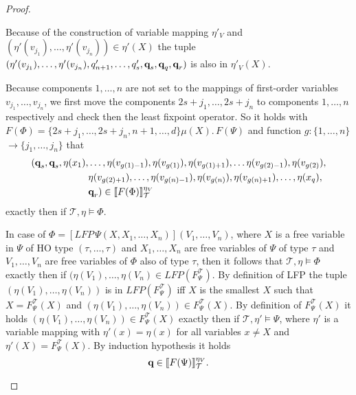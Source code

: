 \begin{proof}
\begin{compactitem}
Because of the construction of variable mapping $\eta'_V$ and $(\eta'(v_{j_1}), \dots, 
        \eta'(v_{j_n})) \in \eta'(X)$ the
        tuple $(\eta'(v_{j_1}), \dots, \eta'(v_{j_n}), q_{n+1}', \dots, q_s', \emph{q}_s, \emph{q}_q, \emph{q}_r)$ is also in $\eta'_V(X)$.         
        
       Because components $1, \dots, n$ are not set to the mappings of first-order variables 
       $v_{j_1}, \dots, v_{j_n}$, we first move the components $2s+j_1, \dots, 2s+j_n$ to components $1, \dots, n$ respectively and check then the least fixpoint operator.
        So it holds with $F(\Phi) = \{2s+j_1, \dots, 2s+j_n, n+1, \dots, d\} \mu (X).\, F(\Psi)$ and
        function $g: \{1, \dots, n\} $ $\rightarrow \{j_1, \dots, j_n\}$ that
        \begin{align*}
            (\emph{q}_s, \emph{q}_s, \eta(x_1),& \dots, \eta(v_{g(1)-1}), \eta(v_{g(1)}), \eta(v_{g(1)+1}), \dots \eta(v_{g(2)-1}), \eta
            (v_{g(2)}),\\& \eta(v_{g(2)+1}), \dots, \eta(v_{g(n)-1}), \eta(v_{g(n)}), \eta(v_{g(n)+1}), \dots, \eta
            (x_q),\\& \emph{q}_r) \in \llbracket  F(\Phi) \rrbracket^{\eta_V
            }_\mathcal{T}
        \end{align*}
        exactly then if $\mathcal{T}, \eta \models \Phi$.

        \item In case of $\Phi = [LFP\,\Psi(X, X_1, \dots, X_n)](V_1, \dots, V_n)$, where $X$ is a
        free variable in $\Psi$ of HO type $(\tau, \dots, \tau)$ and $X_1, \dots, X_n$ are free
        variables of $\Psi$ of type $\tau$ and $V_1, \dots, V_n$ are free variables of $\Phi$ also of type $\tau$, then
        it follows that $\mathcal{T}, \eta \models \Phi$ exactly then if $(\eta(V_1), \dots, \eta(V_n) \in LFP
        (F_\Psi^\mathcal{T})$. By definition of LFP the tuple $(\eta(V_1), \dots, \eta(V_n))$ is in
        $LFP(F_\Psi^\mathcal{T})$ iff $X$ is the smallest $X$ such that $X = F_\Psi^\mathcal{T}(X)$ and $(\eta(V_1), \dots, \eta(V_n)) \in
        F_\Psi^\mathcal{T}(X)$. By definition of $F_\Psi^\mathcal{T}(X)$ it holds $(\eta
        (V_1), \dots, \eta(V_n)) \in F_\Psi^\mathcal{T}(X)$ exactly then if $\mathcal{T}, \eta' 
        \models \Psi$, where $\eta'$ is a variable mapping with $\eta'(x) = \eta(x)$ for all variables $x \neq X$ and $\eta'(X) = F_\Psi^\mathcal{T}(X)$. By induction hypothesis it holds
        \[\emph{q} \in \llbracket  F(\Psi)
        \rrbracket^{\eta_V}_\mathcal{T}.\]


\end{compactitem}
\end{proof}
